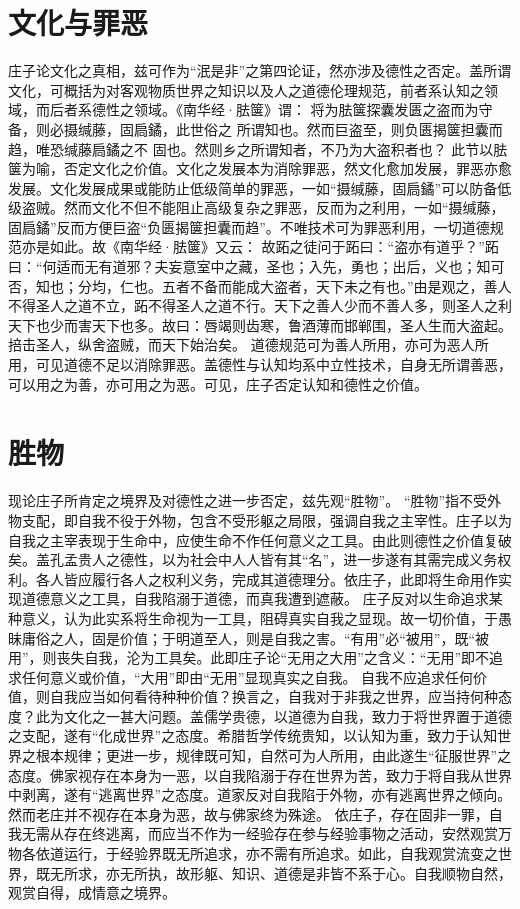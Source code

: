 \documentclass[11pt]{article}
\begin{document}
\section{文化与罪恶}
庄子论文化之真相，兹可作为“泯是非”之第四论证，然亦涉及德性之否定。盖所谓文化，可概括为对客观物质世界之知识以及人之道德伦理规范，前者系认知之领域，而后者系德性之领域。《南华经·胠箧》谓：
将为胠箧探囊发匮之盗而为守备，则必摄缄藤，固扃鐍，此世俗之 所谓知也。然而巨盗至，则负匮揭箧担囊而趋，唯恐缄藤扃鐍之不 固也。然则乡之所谓知者，不乃为大盗积者也？
此节以胠箧为喻，否定文化之价值。文化之发展本为消除罪恶，然文化愈加发展，罪恶亦愈发展。文化发展成果或能防止低级简单的罪恶，一如“摄缄藤，固扃鐍”可以防备低级盗贼。然而文化不但不能阻止高级复杂之罪恶，反而为之利用，一如“摄缄藤，固扃鐍”反而方便巨盗“负匮揭箧担囊而趋”。不唯技术可为罪恶利用，一切道德规范亦是如此。故《南华经·胠箧》又云：
故跖之徒问于跖曰：“盗亦有道乎？”跖曰：“何适而无有道邪？夫妄意室中之藏，圣也；入先，勇也；出后，义也；知可否，知也；分均，仁也。五者不备而能成大盗者，天下未之有也。”由是观之，善人不得圣人之道不立，跖不得圣人之道不行。天下之善人少而不善人多，则圣人之利天下也少而害天下也多。故曰：唇竭则齿寒，鲁酒薄而邯郸围，圣人生而大盗起。掊击圣人，纵舍盗贼，而天下始治矣。
道德规范可为善人所用，亦可为恶人所用，可见道德不足以消除罪恶。盖德性与认知均系中立性技术，自身无所谓善恶，可以用之为善，亦可用之为恶。可见，庄子否定认知和德性之价值。

\section{胜物}
现论庄子所肯定之境界及对德性之进一步否定，兹先观“胜物”。
“胜物”指不受外物支配，即自我不役于外物，包含不受形躯之局限，强调自我之主宰性。庄子以为自我之主宰表现于生命中，应使生命不作任何意义之工具。由此则德性之价值复破矣。盖孔孟贵人之德性，以为社会中人人皆有其“名”，进一步遂有其需完成义务权利。各人皆应履行各人之权利义务，完成其道德理分。依庄子，此即将生命用作实现道德意义之工具，自我陷溺于道德，而真我遭到遮蔽。
庄子反对以生命追求某种意义，认为此实系将生命视为一工具，阻碍真实自我之显现。故一切价值，于愚昧庸俗之人，固是价值；于明道至人，则是自我之害。“有用”必“被用”，既“被用”，则丧失自我，沦为工具矣。此即庄子论“无用之大用”之含义：“无用”即不追求任何意义或价值，“大用”即由“无用”显现真实之自我。
自我不应追求任何价值，则自我应当如何看待种种价值？换言之，自我对于非我之世界，应当持何种态度？此为文化之一甚大问题。盖儒学贵德，以道德为自我，致力于将世界置于道德之支配，遂有“化成世界”之态度。希腊哲学传统贵知，以认知为重，致力于认知世界之根本规律；更进一步，规律既可知，自然可为人所用，由此遂生“征服世界”之态度。佛家视存在本身为一恶，以自我陷溺于存在世界为苦，致力于将自我从世界中剥离，遂有“逃离世界”之态度。道家反对自我陷于外物，亦有逃离世界之倾向。然而老庄并不视存在本身为恶，故与佛家终为殊途。
依庄子，存在固非一罪，自我无需从存在终逃离，而应当不作为一经验存在参与经验事物之活动，安然观赏万物各依道运行，于经验界既无所追求，亦不需有所追求。如此，自我观赏流变之世界，既无所求，亦无所执，故形躯、知识、道德是非皆不系于心。自我顺物自然，观赏自得，成情意之境界。
\end{document}
